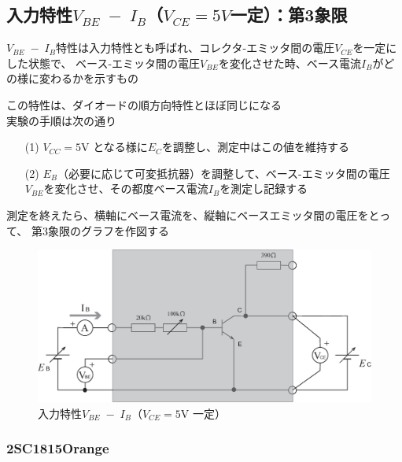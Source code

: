 \documentclass[uplatex,a4paper,11pt,oneside,openany]{jsbook}
\begin{document}
\newpage

\subsection{入力特性$V_{BE}\;-\;I_B$（$V_{CE}=5V$一定）：第3象限}

$V_{BE}\;-\;I_B$特性は入力特性とも呼ばれ、コレクタ-エミッタ間の電圧$V_{CE}$を一定にした状態で、
ベース-エミッタ間の電圧$V_{BE}$を変化させた時、ベース電流$I_B$がどの様に変わるかを示すもの

この特性は、ダイオードの順方向特性とほぼ同じになる\\

実験の手順は次の通り

\begin{enumerate}
\item[(1)] $V_{CC}=5$V となる様に$E_C$を調整し、測定中はこの値を維持する
\item[(2)] $E_B$（必要に応じて可変抵抗器）を調整して、ベース-エミッタ間の電圧$V_{BE}$を変化させ、その都度ベース電流$I_B$を測定し記録する
\end{enumerate}

測定を終えたら、横軸にベース電流を、縦軸にベースエミッタ間の電圧をとって、
第3象限のグラフを作図する

\vfill

\begin{figure}[H]
  \centering
   \includegraphics[keepaspectratio, scale=0.5, angle=0]
               {figs/eps/ex3.eps}
               \caption{入力特性$V_{BE}\;-\;I_B$（$V_{CE}=5$V 一定）}
               \label{fig:ex3}
\end{figure}

\vfill

\newpage

\subsubsection{2SC1815Orange}
\end{document}
